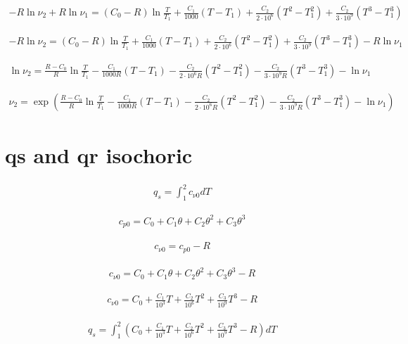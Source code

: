 \documentclass{article}
\begin{document}
	\begin{align*}
		-R\ln\nu_2 + R\ln\nu_1 = (C_0 - R)\ln\frac{T}{T_1} + \frac{C_1}{1000}(T - T_1) + \frac{C_2}{2\cdot10^6}(T^2 - T_1^2) + \frac{C_2}{3\cdot10^9}(T^3 - T_1^3)
	\end{align*}

	\begin{align*}
		-R\ln\nu_2 = (C_0 - R)\ln\frac{T}{T_1} + \frac{C_1}{1000}(T - T_1) + \frac{C_2}{2\cdot10^6}(T^2 - T_1^2) + \frac{C_2}{3\cdot10^9}(T^3 - T_1^3) - R\ln\nu_1
	\end{align*}

	\begin{align*}
		\ln\nu_2 = \frac{R - C_0}{R}\ln\frac{T}{T_1} - \frac{C_1}{1000R}(T - T_1) - \frac{C_2}{2\cdot10^6R}(T^2 - T_1^2) - \frac{C_2}{3\cdot10^9R}(T^3 - T_1^3) - \ln\nu_1
	\end{align*}

	\begin{align*}
		\nu_2 = \exp\left(\frac{R - C_0}{R}\ln\frac{T}{T_1} - \frac{C_1}{1000R}(T - T_1) - \frac{C_2}{2\cdot10^6R}(T^2 - T_1^2) - \frac{C_2}{3\cdot10^9R}(T^3 - T_1^3) - \ln\nu_1\right)
	\end{align*}

	\section{qs and qr isochoric}

	\begin{align*}
		q_s = \int_1^2 c_{\nu0}dT
	\end{align*}

	\begin{align*}
		c_{p0} = C_0 + C_1\theta + C_2\theta^2 + C_3\theta^3
	\end{align*}

	\begin{align*}
		c_{\nu0} = c_{p0} - R
	\end{align*}

	\begin{align*}
		c_{\nu0} = C_0 + C_1\theta + C_2\theta^2 + C_3\theta^3 - R
	\end{align*}

	\begin{align*}
		c_{\nu0} = C_0 + \frac{C_1}{10^3}T + \frac{C_2}{10^6}T^2 + \frac{C_3}{10^9}T^3 - R
	\end{align*}

	\begin{align*}
		q_s = \int_1^2 \left(C_0 + \frac{C_1}{10^3}T + \frac{C_2}{10^6}T^2 + \frac{C_3}{10^9}T^3 - R\right)dT
	\end{align*}
\end{document}
